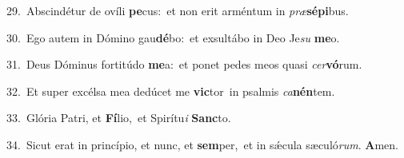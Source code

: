 {\numbfont\textcolor{\numbcolor}{29.}}~Abscindétur de ovíli \textbf{pe}\-cus:~\star et non erit arméntum in \textit{præ}\-\textbf{sé}\textbf{pi}bus.\par
{\numbfont\textcolor{\numbcolor}{30.}}~Ego autem in Dómino gau\-\textbf{dé}\-bo:~\star et exsultábo in Deo Je\textit{su} \textbf{me}\-o.\par
{\numbfont\textcolor{\numbcolor}{31.}}~Deus Dóminus fortitúdo \textbf{me}\-a:~\star et ponet pedes meos quasi \textit{cer}\-\textbf{vó}rum.\par
{\numbfont\textcolor{\numbcolor}{32.}}~Et super excélsa mea dedúcet me \textbf{vic}\-tor~\star in psalmis \textit{ca}\-\textbf{nén}tem.\par
{\numbfont\textcolor{\numbcolor}{33.}}~Glória Patri, et \textbf{Fí}\-lio,~\star et Spirítu\textit{i} \textbf{Sanc}\-to.\par
{\numbfont\textcolor{\numbcolor}{34.}}~Sicut erat in princípio, et nunc, et \textbf{sem}\-per,~\star et in sǽcula sæculó\-\textit{rum}\-. \textbf{A}\-men.\par
